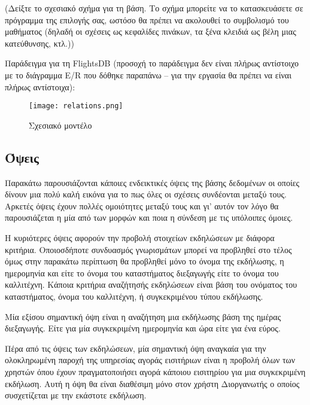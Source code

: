 (Δείξτε το σχεσιακό σχήμα για τη βάση. Το σχήμα μπορείτε να το
κατασκευάσετε σε πρόγραμμα της επιλογής σας, ωστόσο θα πρέπει να
ακολουθεί το συμβολισμό του μαθήματος (δηλαδή οι σχέσεις ως κεφαλίδες
πινάκων, τα ξένα κλειδιά ως βέλη μιας κατεύθυνσης, κτλ.))

Παράδειγμα για τη FlightsDB (προσοχή το παράδειγμα δεν είναι πλήρως
αντίστοιχο με το διάγραμμα E/R που δόθηκε παραπάνω – για την εργασία
θα πρέπει να είναι πλήρως αντίστοιχα):

\begin{figure}[H]
  \centering
  \texttt{[image: relations.png]}
  \caption{Σχεσιακό μοντέλο}
\end{figure}

\subsection{Όψεις}

Παρακάτω παρουσιάζονται κάποιες ενδεικτικές όψεις της βάσης δεδομένων
οι οποίες δίνουν μια πολύ καλή εικόνα για το πως όλες οι σχέσεις
συνδέονται μεταξύ τους. Αρκετές όψεις έχουν πολλές ομοιότητες μεταξύ
τους και γι' αυτόν τον λόγο θα παρουσιάζεται η μία από των μορφών και
ποια η σύνδεση με τις υπόλοιπες όμοιες.

Η κυριότερες όψεις αφορούν την προβολή στοιχείων εκδηλώσεων με διάφορα
κριτήρια. Οποιοσδήποτε συνδυασμός γνωρισμάτων μπορεί να προβληθεί στο
τέλος όμως στην παρακάτω περίπτωση θα προβληθεί μόνο το όνομα της
εκδήλωσης, η ημερομηνία και είτε το όνομα του καταστήματος διεξαγωγής
είτε το όνομα του καλλιτέχνη. Κάποια κριτήρια αναζήτησής εκδηλώσεων
είναι βάση του ονόματος του καταστήματος, όνομα του καλλιτέχνη, ή
συγκεκριμένου τύπου εκδήλωσης.


Μία εξίσου σημαντική όψη είναι η αναζήτηση μια εκδήλωσης βάση της
ημέρας διεξαγωγής. Είτε για μία συγκεκριμένη ημερομηνία και ώρα είτε
για ένα εύρος.


Πέρα από τις όψεις των εκδηλώσεων, μία σημαντική όψη αναγκαία για την
ολοκληρωμένη παροχή της υπηρεσίας αγοράς εισιτήριων είναι η προβολή
όλων των χρηστών όπου έχουν πραγματοποιήσει αγορά κάποιου εισιτηρίου
για μια συγκεκριμένη εκδήλωση. Αυτή η όψη θα είναι διαθέσιμη μόνο στον
χρήστη Διοργανωτής ο οποίος συσχετίζεται με την εκάστοτε εκδήλωση.


